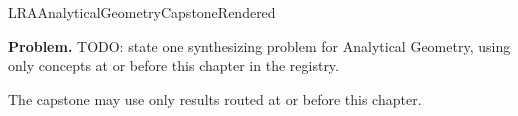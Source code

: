 \ifcsname LRAAnalyticalGeometryCapstoneRendered\endcsname
\else
\expandafter\gdef\csname LRAAnalyticalGeometryCapstoneRendered\endcsname{}

\newpage
{}
\label{cap:analytical-geometry}

\begin{tcolorbox}[
  colback=gray!6,
  colframe=gray!40,
  arc=2pt,
  left=8pt, right=8pt, top=6pt, bottom=6pt,
  title={\small\textbf{Capstone Problem}},
  fonttitle=\small\bfseries
]
\textbf{Problem.}
TODO: state one synthesizing problem for Analytical Geometry, using only concepts at or
before this chapter in the registry.
\end{tcolorbox}

\begin{remark*}
The capstone may use only results routed at or before this chapter.
\end{remark*}

\clearpage
\fi

